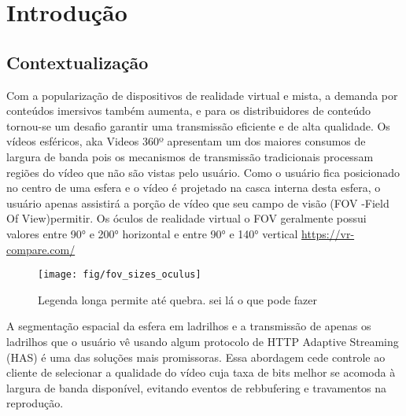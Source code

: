 
\chapter{Introdução}\label{Cap:Introduction}


\section{Contextualização}

Com a popularização de dispositivos de realidade virtual e mista, a demanda por conteúdos imersivos também aumenta, e para os distribuidores de conteúdo tornou-se um desafio garantir uma transmissão eficiente e de alta qualidade. Os vídeos esféricos, aka Videos 360º apresentam um dos maiores consumos de largura de banda pois os mecanismos de transmissão tradicionais processam regiões do vídeo que não são vistas pelo usuário. Como o usuário fica posicionado no centro de uma esfera e o vídeo é projetado na casca interna desta esfera, o usuário apenas assistirá a porção de vídeo que seu campo de visão (FOV -Field Of View)permitir. Os óculos de realidade virtual o FOV geralmente possui valores entre 90° e 200° horizontal e entre 90° e 140° vertical
\href{https://vr-compare.com/}{https://vr-compare.com/}

\begin{figure}[tbh]
	\centering
	\texttt{[image: fig/fov\_sizes\_oculus]}
	\caption[legenda curta]{Legenda longa permite até quebra. sei lá o que pode fazer}
	\label{fig:fovsizesoculus}
\end{figure}

A segmentação espacial da esfera em ladrilhos e a transmissão de apenas os ladrilhos que o usuário vê usando algum protocolo de HTTP Adaptive Streaming (HAS) é uma das soluções mais promissoras. Essa abordagem cede controle ao cliente de selecionar a qualidade do vídeo cuja taxa de bits melhor se acomoda à largura de banda disponível, evitando eventos de rebbufering e travamentos na reprodução.

